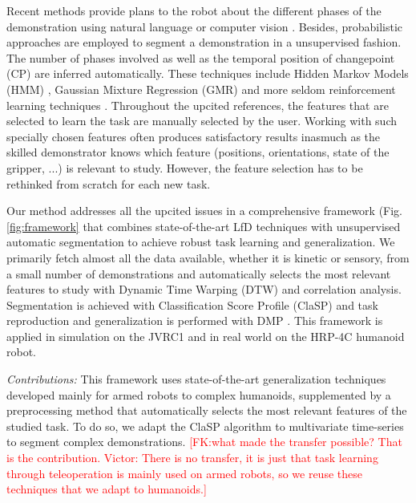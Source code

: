 \documentclass[conference]{IEEEtran}
\newcommand{\fk}[1]{\textcolor{red}{[FK:#1]}}
\begin{document}
Recent methods provide plans to the robot about the different phases of the demonstration using natural language or computer vision \cite{caccavale_kinesthetic_2019} \cite{saran_enhancing_2019}. Besides, probabilistic approaches are employed to segment a demonstration in a unsupervised fashion. The number of phases involved as well as the temporal position of changepoint (CP) are inferred automatically. These techniques include Hidden Markov Models (HMM) \cite{niekum_learning_2015}, Gaussian Mixture Regression (GMR) \cite{calinon_learning_2010} \cite{calinon_learning_2007} and more seldom reinforcement learning techniques \cite{kroemer_towards_2015}. Throughout the upcited references, the features that are selected to learn the task are manually selected by the user. Working with such specially chosen features often produces satisfactory results inasmuch as the skilled demonstrator knows which feature (positions, orientations, state of the gripper, ...) is relevant to study. However, the feature selection has to be rethinked from scratch for each new task. \newline

Our method addresses all the upcited issues in a comprehensive framework (Fig. \ref{fig:framework} that combines state-of-the-art LfD techniques with unsupervised automatic segmentation to achieve robust task learning and generalization. We primarily fetch almost all the data available, whether it is kinetic  or sensory, from a small number of demonstrations and automatically selects the most relevant features to study with Dynamic Time Warping (DTW) \cite{dtw} and correlation analysis. Segmentation is achieved with Classification Score Profile (ClaSP) \cite{clasp} and task reproduction and generalization is performed with DMP \cite{ijspeert_movement_2002} \cite{ijspeert_dynamical_2013}. This framework is applied in simulation on the JVRC1 \cite{jvrc} and in real world on the HRP-4C \cite{hrp4} humanoid robot.

\textit{Contributions:} 
This framework uses state-of-the-art generalization techniques developed mainly for armed robots to complex humanoids, supplemented by a preprocessing method that automatically selects the most relevant features of the studied task. To do so, we adapt the ClaSP \cite{clasp} algorithm to multivariate time-series to segment complex demonstrations.
\fk{what made the transfer possible? That is the contribution. \newline
Victor: There is no transfer, it is just that task learning through teleoperation is mainly used on armed robots, so we reuse these techniques that we adapt to humanoids.}
\end{document}
